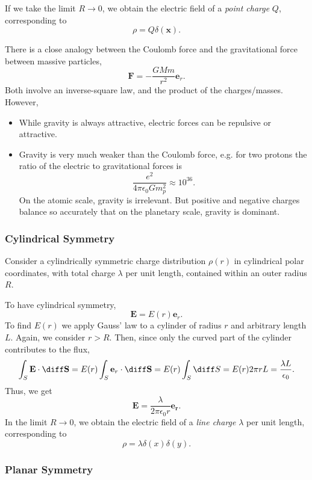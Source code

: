 \documentclass[12pt]{article}
\begin{document}
If we take the limit $R \to 0$, we obtain the electric field of a \emph{point charge} $Q$, corresponding to
\[
\rho = Q \delta(\mathbf{x})
.\]

There is a close analogy between the Coulomb force and the gravitational force between massive particles,
\[
	\mathbf{F} = - \frac{GMm}{r^2} \mathbf{e}_r
.\]
Both involve an inverse-square law, and the product of the charges/masses. However,
\begin{itemize}
	\item While gravity is always attractive, electric forces can be repulsive or attractive.
	\item Gravity is very much weaker than the Coulomb force, e.g. for two protons the ratio of the electric to gravitational forces is
		\[
		\frac{e^2}{4 \pi \epsilon_0 G m_p^2} \approx 10^{36}
		.\]
		On the atomic scale, gravity is irrelevant. But positive and negative charges balance so accurately that on the planetary scale, gravity is dominant.
\end{itemize}

\subsubsection{Cylindrical Symmetry}
\label{subsub:cylindrical_symmetry}

Consider a cylindrically symmetric charge distribution $\rho(r)$ in cylindrical polar coordinates, with total charge $\lambda$ per unit length, contained within an outer radius $R$.

To have cylindrical symmetry,
\[
\mathbf{E} = E(r) \mathbf{e}_r
.\]
To find  $E(r)$ we apply Gauss' law to a cylinder of radius $r$ and arbitrary length $L$. Again, we consider $r > R$. Then, since only the curved part of the cylinder contributes to the flux,
\[
\int_{S}\mathbf{E} \cdot \diff \mathbf{S} = E(r) \int_{S}\mathbf{e}_r \cdot \diff \mathbf{S} = E(r) \int_{S} \diff S = E(r) 2 \pi r L = \frac{\lambda L}{\epsilon_0}
.\]
Thus, we get
\[
\mathbf{E} = \frac{\lambda}{2 \pi \epsilon_0 r} \mathbf{e_r}
.\]
In the limit $R \to 0$, we obtain the electric field of a \emph{line charge} $\lambda$ per unit length, corresponding to
\[
\rho = \lambda \delta(x) \delta(y)
.\]

\subsubsection{Planar Symmetry}
\label{subsub:planar_symmetry}
\end{document}
